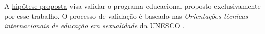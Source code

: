 \vspace{-0.4cm}

A \hyperref[hipotese]{hipótese proposta} visa validar o programa educacional proposto exclusivamente por esse trabalho. O processo de validação é baseado nas \textit{Orientações técnicas internacionais de educação em sexualidade} da UNESCO \cite{women2018international}. 









